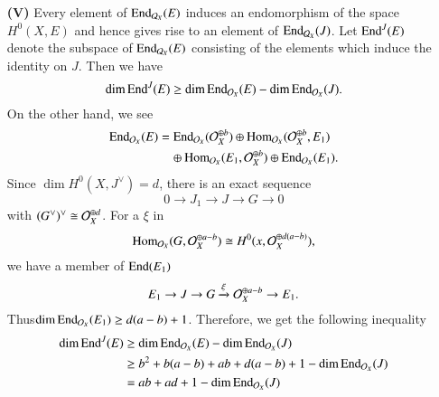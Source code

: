 \begin{itemize}
\item[{\bf(V)}] Every element of $\operatorname{End}_{\mathcal{Q}_{X}}(E)$ induces an endomorphism of the space $H^{0}(X,E)$ and hence gives rise to an element of $\operatorname{End}_{\mathcal{Q}_{X}}(J)$. Let $\operatorname{End}^{J}(E)$ denote the subspace of $\operatorname{End}_{\mathcal{Q}_{X}}(E)$ consisting of the elements which induce the identity on $J$. Then we have
$$
\dim \operatorname{End}^{J}(E) \geq \dim \operatorname{End}_{\mathcal{O}_{X}}(E)-\dim\operatorname{End}_{\mathcal{O}_{X}}(J).
$$
On the other hand, we see
\begin{align*}
\operatorname{End}_{\mathcal{O}_{X}}(E) &= \operatorname{End}_{\mathcal{O}_{X}}(\mathcal{O}_{X}^{\oplus b}) \oplus \operatorname{Hom}_{\mathcal{O}_{X}}(\mathcal{O}_{X}^{\oplus b}, E_{1})\\
                    &\quad  \oplus \operatorname{Hom}_{\mathcal{O}_{X}}(E_{1}, \mathcal{O}_{X}^{\oplus b}) \oplus \operatorname{End}_{\mathcal{O}_{X}}(E_{1}).
\end{align*}
Since $\dim H^{0}(X, J^{\vee})=d$, there is an exact sequence
$$
0 \rightarrow J_{1} \rightarrow  J \rightarrow G \rightarrow 0
$$
with $(G^{\vee})^{\vee} \cong \mathcal{O}_{X}^{\oplus d}$. For a $\xi$ in 
$$
\operatorname{Hom}_{\mathcal{O}_{X}}(G, \mathcal{O}_{X}^{\oplus a-b})\cong H^{0}(x, \mathcal{O}_{X}^{\oplus d(a-b)}),
$$ 
we have a member of $\operatorname{End}(E_{1})$
$$
E_{1} \rightarrow J \rightarrow G \xrightarrow{\xi} \mathcal{O}_{X}^{\oplus a-b} \rightarrow E_{1}.
$$
Thus\pageoriginale $\dim \operatorname{End}_{\mathcal{O}_{X}}(E_{1}) \geq d(a-b)+ 1$. Therefore, we get the following inequality
{\small
\begin{align*}
\dim \operatorname{End}^{J}(E) &\geq \dim \operatorname{End}_{\mathcal{O}_{X}}(E)-\dim \operatorname{End}_{\mathcal{O}_{X}}(J)\\
 &\geq b^{2} + b(a-b) + ab + d(a-b) + 1 -\dim \operatorname{End}_{\mathcal{O}_{X}}(J)\\
 &= ab + ad + 1 - \dim\operatorname{End}_{\mathcal{O}_{X}}(J)
\end{align*}}


\end{itemize}
